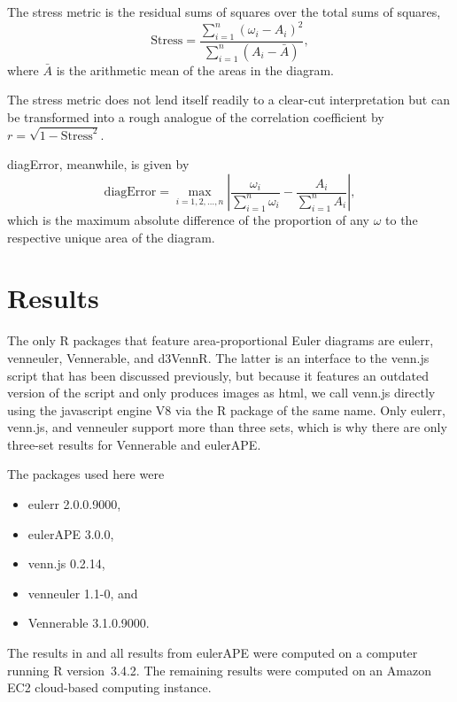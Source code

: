 \documentclass[
  oneside,
  openany,
  numbers=noendperiod,
  parskip=half,
  bibliography=totoc
]{scrbook}\usepackage[]{graphicx}\usepackage{xcolor}
\newcommand{\proglang}[1]{\textsf{#1}}
\newcommand{\pkg}[1]{{\fontseries{b}\selectfont #1}}
\begin{document}
The stress metric is the residual sums of squares over the total sums of
squares,
\begin{equation}
\text{Stress} = \frac{\sum_{i=1}^n (\omega_i - A_i)^2}{\sum_{i=1}^n
  (A_i - \bar{A})},
\label{eq:stress}
\end{equation}
where $\bar{A}$ is the arithmetic mean of the areas in the diagram.

The stress metric does not lend itself readily to a clear-cut interpretation but
can be transformed into a rough analogue of the correlation coefficient by $r = \sqrt{1-\text{Stress}^2}$.

diagError, meanwhile, is given by
\begin{equation}
\text{diagError} = \max_{i = 1, 2, \dots, n} \left|
  \frac{\omega_i}{\sum_{i=1}^n \omega_i} -\frac{A_i}{\sum_{i=1}^n A_i} \right|,
\label{eq:diagError}
\end{equation}
which is the maximum absolute difference of the proportion of any $\omega$ to
the respective unique area of the diagram.

\chapter{Results}
\label{ch:results}

The only R packages that feature area-proportional Euler diagrams are
\pkg{eulerr}, \pkg{venneuler}, \pkg{Vennerable}, and \pkg{d3VennR}. The latter
is an interface to the \pkg{venn.js} script that has been discussed previously,
but because it features an outdated version of the script and only produces
images as html, we call \pkg{venn.js} directly using the \proglang{javascript}
engine \pkg{V8} via the R package of the same name.
Only \pkg{eulerr}, \pkg{venn.js}, and \pkg{venneuler} support more than three
sets, which is why there are only three-set results for \pkg{Vennerable} and
\pkg{eulerAPE}.

The packages used here were
\begin{itemize}
  \item \pkg{eulerr} 2.0.0.9000,
  \item \pkg{eulerAPE} 3.0.0,
  \item \pkg{venn.js} 0.2.14,
  \item \pkg{venneuler} 1.1-0, and
  \item \pkg{Vennerable} 3.1.0.9000.
\end{itemize}

The results in  and all results from \pkg{eulerAPE}
were computed on a computer
running R version~3.4.2. The remaining results were computed on an Amazon EC2
cloud-based computing instance.
\end{document}
